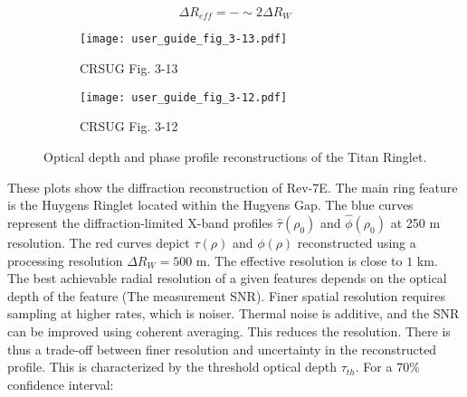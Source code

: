 \documentclass{article}
\begin{document}
            \begin{equation}
            \Delta R_{eff} = -\sim 2\Delta R_{W}
            \end{equation}
            \begin{figure}[H]
                \centering
                \captionsetup{type=figure}
                \begin{subfigure}[b]{0.49\textwidth}
                    \centering \texttt{[image: user\_guide\_fig\_3-13.pdf]}
                    \caption{CRSUG Fig. 3-13}
                    \label{fig:UGfig3-13}
                \end{subfigure}
                \begin{subfigure}[b]{0.49\textwidth}
                    \centering
                    \texttt{[image: user\_guide\_fig\_3-12.pdf]}
                    \caption{CRSUG Fig. 3-12}
                    \label{fig:UGfig3-12}
                \end{subfigure}
                \caption[Titan Ringlet - CRSUG Fig.~3.13]{Optical depth and phase profile reconstructions of the Titan Ringlet.}
                \label{fig:TitanRinglet}
            \end{figure}
            These plots show the diffraction reconstruction of Rev-7E. The main ring feature is the Huygens Ringlet located within the Hugyens Gap. The blue curves represent the diffraction-limited X-band profiles $\hat{\tau}(\rho_0)$ and $\hat{\phi}(\rho_0)$ at 250 m resolution. The red curves depict $\tau(\rho)$ and $\phi(\rho)$ reconstructed using a processing resolution $\Delta R_{W} = 500$ m. The effective resolution is close to $1$ km. The best achievable radial resolution of a given features depends on the optical depth of the feature (The measurement SNR). Finer spatial resolution requires sampling at higher rates, which is noiser. Thermal noise is additive, and the SNR can be improved using coherent averaging. This reduces the resolution. There is thus a trade-off between finer resolution and uncertainty in the reconstructed profile. This is characterized by the threshold optical depth $\tau_{th}$. For a $70\%$ confidence interval:
\end{document}
